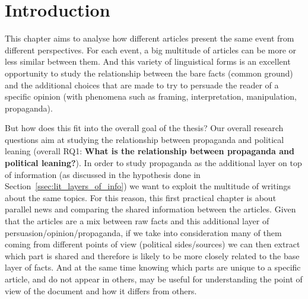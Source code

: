 \section{\statusgreen Introduction}


This chapter aims to analyse how different articles present the same event from different perspectives. For each \gls{event}, a big multitude of articles can be more or less similar between them.
And this variety of linguistical forms is an excellent opportunity to study the relationship between the bare facts (common ground) and the additional choices that are made to try to persuade the reader of a specific opinion (with phenomena such as framing, interpretation, manipulation, propaganda).

But how does this fit into the overall goal of the thesis? Our overall research questions aim at studying the relationship between propaganda and political leaning (overall RQ1: \textbf{What is the relationship between propaganda and political leaning?}).
In order to study propaganda as the additional layer on top of information
(as discussed in the hypothesis done in Section~\ref{ssec:lit_layers_of_info})
we want to exploit the multitude of writings about the same topics. For this reason, this first practical chapter is about parallel news and comparing the shared information between the articles.
Given that the articles are a mix between raw facts and this additional layer of persuasion/opinion/propaganda, %
if we take into consideration many of them coming from different points of view (political sides/sources) we can then extract which part is shared and therefore is likely to be more closely related to the base layer of facts.
And at the same time knowing which parts are unique to a specific article, and do not appear in others, may be useful for understanding the point of view of the document and how it differs from others.

